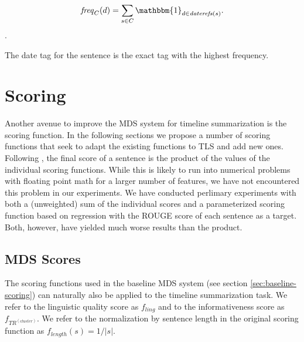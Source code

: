 \documentclass[a4paper,BCOR=10mm]{report}
\numberwithin{lemma}{chapter}
\numberwithin{definition}{chapter}
\begin{document}
\begin{equation}
\mathit{freq}_C(d) = \sum_{s \in C} \mathbbm{1}_{d \in \mathit{daterefs}(s)}.
\end{equation}.

The date tag for the sentence is the exact tag with the highest frequency.



\section{Scoring} \label{sec:scoring}

Another avenue to improve the MDS system for timeline summarization is the scoring function.
In the following sections we propose a number of scoring functions that seek to adapt the existing functions to TLS and add new ones.
Following \citet{banerjee}, the final score of a sentence is the product of the values of the individual scoring functions.
While this is likely to run into numerical problems with floating point math for a larger number of features, we have not encountered this problem in our experiments.
We have conducted perlimary experiments with both a (unweighted) sum of the individual scores and a parameterized scoring function based on regression with the ROUGE score of each sentence as a target. Both, however, have yielded much worse results than the product.

\subsection{MDS Scores} \label{sec:mds-scores}

The scoring functions used in the baseline MDS system (see section \ref{sec:baseline-scoring}) can naturally also be applied to the timeline summarization task.
We refer to the linguistic quality score as $f_{ling}$ and to the informativeness score as $f_{TR^{(cluster)}}$.
We refer to the normalization by sentence length in the original scoring function as $f_{length}(s) = 1 / |s|$.
\end{document}
